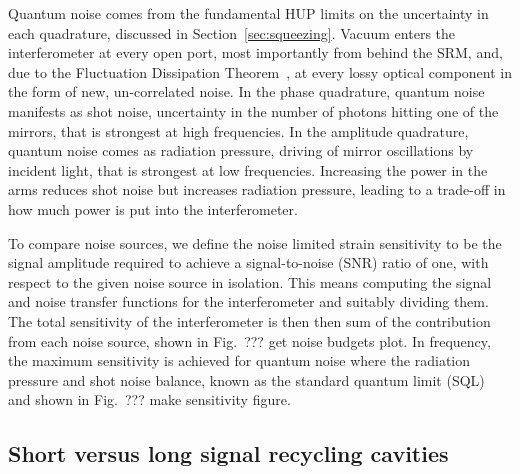 \documentclass[aps,pra,superscriptaddress,reprint,nofootinbib]{revtex4-1}
\begin{document}
Quantum noise comes from the fundamental HUP limits on the uncertainty in each quadrature, discussed in Section~\ref{sec:squeezing}. Vacuum enters the interferometer at every open port, most importantly from behind the SRM, and, due to the Fluctuation Dissipation Theorem~\cite{Danilishin_2012}, at every lossy optical component in the form of new, un-correlated noise. In the phase quadrature, quantum noise manifests as shot noise, uncertainty in the number of photons hitting one of the mirrors, that is strongest at high frequencies. In the amplitude quadrature, quantum noise comes as radiation pressure, driving of mirror oscillations by incident light, that is strongest at low frequencies. Increasing the power in the arms reduces shot noise but increases radiation pressure, leading to a trade-off in how much power is put into the interferometer.


To compare noise sources, we define the noise limited strain sensitivity to be the signal amplitude required to achieve a signal-to-noise (SNR) ratio of one, with respect to the given noise source in isolation. This means computing the signal and noise transfer functions for the interferometer and suitably dividing them. The total sensitivity of the interferometer is then then sum of the contribution from each noise source, shown in Fig.~{\Large ??? get noise budgets plot}.
In frequency, the maximum sensitivity is achieved for quantum noise where the radiation pressure and shot noise balance, known as the standard quantum limit (SQL) and shown in Fig.~{\Large ??? make sensitivity figure}.	


\subsection{Short versus long signal recycling cavities}
\label{sec:long_srcs}
\end{document}
